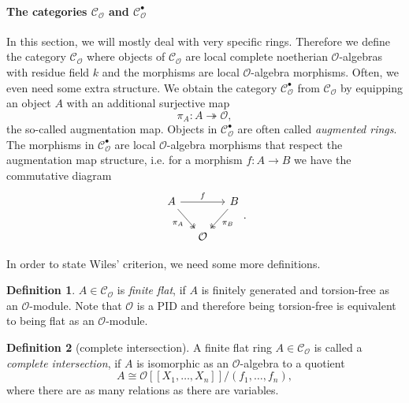 \documentclass{article}
\theoremstyle{plain}%
\theoremstyle{definition}
\newtheorem{definition}{Definition}[section]
\theoremstyle{remark}
\newcommand{\cob}{\mathcal{C}_\mathcal{O}^\bullet}
\newcommand{\co}{\mathcal{C}_\mathcal{O}}
\begin{document}
\paragraph{The categories \(\co\) and \(\cob\)}
In this section, we will mostly deal with very specific rings. 
Therefore we define the category \(\co\) where objects of \(\co\) are local complete noetherian \(\mathcal O\)-algebras 
with residue field \(k\) and the morphisms are local \(\mathcal{O}\)-algebra morphisms.
Often, we even need some extra structure. 
We obtain the category \(\cob\) from \(\co\) by equipping an object \(A\) with an additional surjective map
\[\pi_A \colon A \twoheadrightarrow \mathcal{O},\]
the so-called augmentation map. Objects in \(\cob\) are often called \textit{augmented rings}.
The morphisms in \(\cob\) are local \(\mathcal{O}\)-algebra morphisms that respect the augmentation map structure, 
i.e. for a morphism \(f \colon A \to B\) we have the commutative diagram
\[
\begin{tikzcd}[column sep=small]
    A \arrow[rr, "f"] \arrow [dr, "\pi_A", swap, twoheadrightarrow] & & B \arrow [dl, "\pi_B", twoheadrightarrow]\\
    & \mathcal{O} &
\end{tikzcd}.
\]

In order to state Wiles' criterion, we need some more definitions.
\begin{definition}
    \(A \in \co\) is \textit{finite flat}, if \(A\) is finitely generated 
    and torsion-free as an \(\mathcal{O}\)-module.
    Note that \(\mathcal{O}\) is a PID and therefore being torsion-free 
    is equivalent to being flat as an \(\mathcal{O}\)-module.
\end{definition}

\begin{definition}[complete intersection]
    A finite flat ring \(A \in \co\) is called a \textit{complete intersection}, 
    if \(A\) is isomorphic as an \(\mathcal{O}\)-algebra to a quotient
    \[A \cong \mathcal{O}[[X_1, \dots, X_n]]/(f_1, \dots, f_n),\] 
    where there are as many relations as there are variables.
\end{definition}
\end{document}
